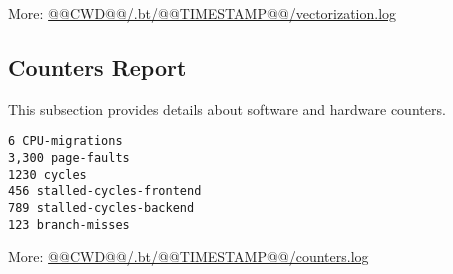 \documentclass[a4paper]{article}
\begin{document}
More: \url{@@CWD@@/.bt/@@TIMESTAMP@@/vectorization.log}

\subsection{Counters Report}

This subsection provides details about software and hardware counters.

\begin{verbatim}
6 CPU-migrations
3,300 page-faults
1230 cycles
456 stalled-cycles-frontend
789 stalled-cycles-backend
123 branch-misses
\end{verbatim}

More: \url{@@CWD@@/.bt/@@TIMESTAMP@@/counters.log}
\end{document}
